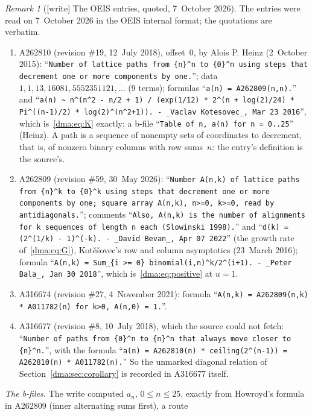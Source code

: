 \documentclass[11pt,letterpaper]{article}
\theoremstyle{remark}\newtheorem{remark}[theorem]{Remark}
\begin{document}
\begin{remark}[{[write]} The OEIS entries, quoted, 7~October 2026]\label{dma:rem:oeis}
The entries were read on 7~October 2026 in the OEIS internal format; the
quotations are verbatim.
\begin{enumerate}[label=(\alph*)]\raggedright
\item A262810 (revision \#19, 12~July 2018), offset~$0$, by Alois P. Heinz
 (2~October 2015): ``\texttt{Number of lattice paths from \{n\}\^{}n to
 \{0\}\^{}n using steps that decrement one or more components by one.}'';
 data $1,1,13,16081,5552351121,\dots$ (9 terms); formulas ``\texttt{a(n) =
 A262809(n,n).}'' and ``\texttt{a(n) \textasciitilde{} n\^{}(n\^{}2 - n/2 + 1) /
 (exp(1/12) * 2\^{}(n + log(2)/24) * Pi\^{}((n-1)/2) * log(2)\^{}(n\^{}2+1)). -
 \_Vaclav Kotesovec\_, Mar 23 2016}'', which is~\eqref{dma:eq:K} exactly; a
 b-file ``\texttt{Table of n, a(n) for n = 0..25}'' (Heinz). A path is a
 sequence of nonempty sets of coordinates to decrement, that is, of nonzero
 binary columns with row sums~$n$: the entry's definition is the source's.
\item A262809 (revision \#59, 30~May 2026): ``\texttt{Number A(n,k) of
 lattice paths from \{n\}\^{}k to \{0\}\^{}k using steps that decrement one or
 more components by one; square array A(n,k), n>=0, k>=0, read by
 antidiagonals.}''; comments ``\texttt{Also, A(n,k) is the number of
 alignments for k sequences of length n each (Slowinski 1998).}'' and
 ``\texttt{d(k) = (2\^{}(1/k) - 1)\^{}(-k). - \_David Bevan\_, Apr 07 2022}''
 (the growth rate of~\eqref{dma:eq:G}), Kot\v{e}\v{s}ovec's row and column
 asymptotics (23~March 2016); formula ``\texttt{A(n,k) = Sum\_\{i >= 0\}
 binomial(i,n)\^{}k/2\^{}(i+1). - \_Peter Bala\_, Jan 30 2018}'', which
 is~\eqref{dma:eq:positive} at $u=1$.
\item A316674 (revision \#27, 4~November 2021): formula ``\texttt{A(n,k) =
 A262809(n,k) * A011782(n) for k>0, A(n,0) = 1.}''.
\item A316677 (revision \#8, 10~July 2018), which the source could not fetch:
 ``\texttt{Number of paths from \{0\}\^{}n to \{n\}\^{}n that always move
 closer to \{n\}\^{}n.}'', with the formula ``\texttt{a(n) = A262810(n) *
 ceiling(2\^{}(n-1)) = A262810(n) * A011782(n).}'' So the unmarked diagonal
 relation of Section~\ref{dma:sec:corollary} is recorded in A316677 itself.
\end{enumerate}
\emph{The b-files.} The write computed $a_n$, $0\le n\le25$, exactly from
Howroyd's formula in A262809 (inner alternating sums first), a route

\end{remark}
\end{document}
